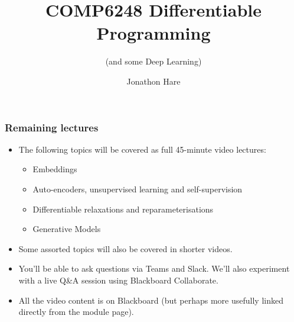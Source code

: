 \documentclass[\beamerclass]{beamer}
\title[COMP6248 Deep Learning]{COMP6248 Differentiable Programming}
\subtitle{(and some Deep Learning)}
\author{Jonathon Hare}
\institute[]
{
  Vision, Learning and Control\\
  University of Southampton 
}
\date{}
\begin{document}
\begin{frame}[plain]
\end{frame}

\frame{
  \titlepage
}

\begin{frame}
\frametitle{Remaining lectures}

\begin{itemize}
	\item<+-> The following topics will be covered as full 45-minute video lectures:
	\begin{itemize}
		\item Embeddings
		\item Auto-encoders, unsupervised learning and self-supervision
		\item Differentiable relaxations and reparameterisations
		\item Generative Models
	\end{itemize}
	\item<+-> Some assorted topics will also be covered in shorter videos.
	\item<+-> You'll be able to ask questions via Teams and Slack. We'll also experiment with a live Q\&A session using Blackboard Collaborate.
	\item<+-> All the video content is on Blackboard (but perhaps more usefully linked directly from the module page).
\end{itemize}
\end{frame}
\end{document}
